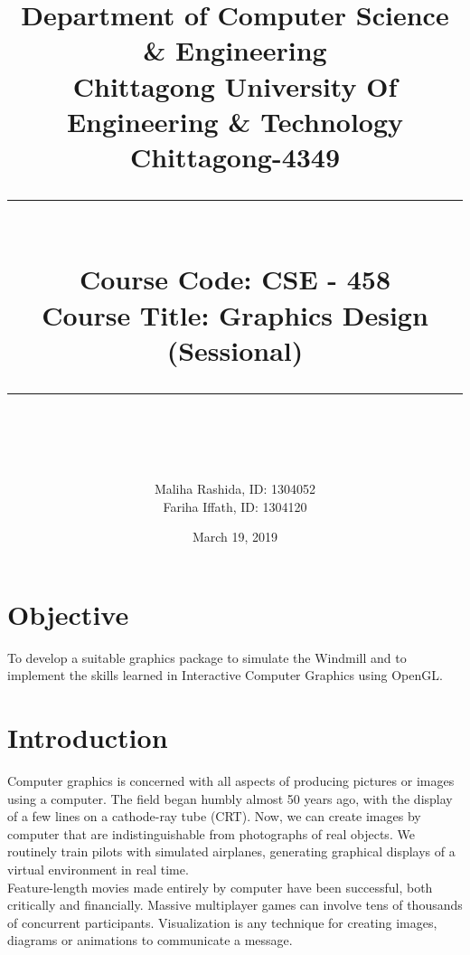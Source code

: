 \documentclass[fontsize=12pt]{article}
\begin{document}

\title{Department of Computer Science \&  Engineering \\ Chittagong University Of Engineering \& Technology \\ Chittagong-4349\\ 
	\noindent\rule{13cm}{0.4pt}\\
	 Course Code: CSE - 458\\Course Title: Graphics Design (Sessional)\\
	\noindent\rule{13cm}{0.4pt}\\
}


\author {
       Maliha Rashida, ID: 1304052\\
	Fariha Iffath, ID: 1304120\\	
}
\date{March 19, 2019}

\maketitle
\newpage

\tableofcontents
\newpage

\section{Objective} %

To develop a suitable graphics package to simulate the Windmill and to implement the skills learned in Interactive Computer Graphics  using OpenGL.

\section{Introduction}

Computer graphics is concerned with all aspects of producing pictures or images using a computer. The field began humbly almost 50 years ago, with the display of a few lines on a cathode-ray tube (CRT). Now, we can create images by computer that are indistinguishable from photographs of real objects. We routinely train pilots with simulated airplanes, generating graphical displays of a virtual environment in real time.\\
Feature-length movies made entirely by computer have been successful, both critically and financially. Massive multiplayer games can involve tens of thousands of concurrent participants. Visualization is any technique for creating images, diagrams or animations to communicate a message.
\end{document}

